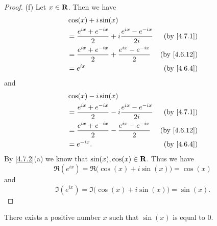 \begin{proof}{(f)}
  Let \(x \in \mathbf{R}\).
  Then we have
  \begin{align*}
     & \cos(x) + i \sin(x)                                                                            \\
     & = \frac{e^{i x} + e^{- i x}}{2} + i \frac{e^{i x} - e^{- i x}}{2i} & \text{(by \cref{4.7.1})}  \\
     & = \frac{e^{i x} + e^{- i x}}{2} + \frac{e^{i x} - e^{- i x}}{2}    & \text{(by \cref{4.6.12})} \\
     & = e^{i x}                                                          & \text{(by \cref{4.6.4})}
  \end{align*}
  and
  \begin{align*}
     & \cos(x) - i \sin(x)                                                                            \\
     & = \frac{e^{i x} + e^{- i x}}{2} - i \frac{e^{i x} - e^{- i x}}{2i} & \text{(by \cref{4.7.1})}  \\
     & = \frac{e^{i x} + e^{- i x}}{2} - \frac{e^{i x} - e^{- i x}}{2}    & \text{(by \cref{4.6.12})} \\
     & = e^{- i x}.                                                       & \text{(by \cref{4.6.4})}
  \end{align*}
  By \cref{4.7.2}(a) we know that \(\sin(x), \cos(x) \in \mathbf{R}\).
  Thus we have
  \[
    \Re(e^{i x}) = \Re\big(\cos(x) + i \sin(x)\big) = \cos(x)
  \]
  and
  \[
    \Im(e^{i x}) = \Im\big(\cos(x) + i \sin(x)\big) = \sin(x).
  \]
\end{proof}

\begin{lemma}\label{4.7.3}
  There exists a positive number \(x\) such that \(\sin(x)\) is equal to \(0\).
\end{lemma}

